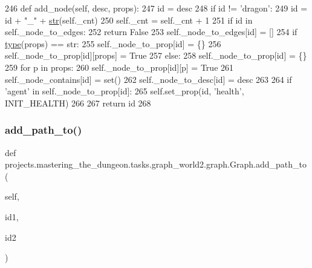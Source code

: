 \begin{DoxyCode}
246     \textcolor{keyword}{def }add\_node(self, desc, props):
247         id = desc
248         \textcolor{keywordflow}{if} id != \textcolor{stringliteral}{'dragon'}:
249             id = id + \textcolor{stringliteral}{"\_"} + \hyperlink{namespacegenerate__task__READMEs_a5b88452ffb87b78c8c85ececebafc09f}{str}(self.\_cnt)
250         self.\_cnt = self.\_cnt + 1
251         \textcolor{keywordflow}{if} id \textcolor{keywordflow}{in} self.\_node\_to\_edges:
252             \textcolor{keywordflow}{return} \textcolor{keyword}{False}
253         self.\_node\_to\_edges[id] = []
254         \textcolor{keywordflow}{if} \hyperlink{namespaceparlai_1_1agents_1_1tfidf__retriever_1_1build__tfidf_ad5dfae268e23f506da084a9efb72f619}{type}(props) == str:
255             self.\_node\_to\_prop[id] = \{\}
256             self.\_node\_to\_prop[id][props] = \textcolor{keyword}{True}
257         \textcolor{keywordflow}{else}:
258             self.\_node\_to\_prop[id] = \{\}
259             \textcolor{keywordflow}{for} p \textcolor{keywordflow}{in} props:
260                 self.\_node\_to\_prop[id][p] = \textcolor{keyword}{True}
261         self.\_node\_contains[id] = set()
262         self.\_node\_to\_desc[id] = desc
263 
264         \textcolor{keywordflow}{if} \textcolor{stringliteral}{'agent'} \textcolor{keywordflow}{in} self.\_node\_to\_prop[id]:
265             self.set\_prop(id, \textcolor{stringliteral}{'health'}, INIT\_HEALTH)
266 
267         \textcolor{keywordflow}{return} id
268 
\end{DoxyCode}
\mbox{\label{classprojects_1_1mastering__the__dungeon_1_1tasks_1_1graph__world2_1_1graph_1_1Graph_a43f24abdb3c8f2c549570bc3e8382c11}} 
\subsubsection{\texorpdfstring{add\+\_\+path\+\_\+to()}{add\_path\_to()}}
{\footnotesize\ttfamily def projects.\+mastering\+\_\+the\+\_\+dungeon.\+tasks.\+graph\+\_\+world2.\+graph.\+Graph.\+add\+\_\+path\+\_\+to (\begin{DoxyParamCaption}\item[{}]{self,  }\item[{}]{id1,  }\item[{}]{id2 }\end{DoxyParamCaption})}



